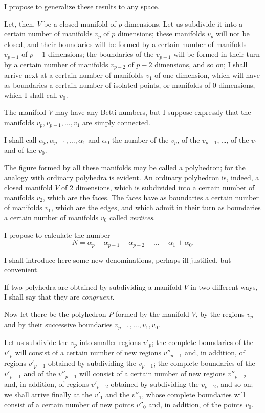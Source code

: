 \documentclass{article}
\begin{document}
I propose to generalize these results to any space.

Let, then, $V$ be a closed manifold of $p$ dimensions. Let us subdivide it into a certain number of manifolds $v_{p}$ of $p$ dimensions; these manifolds $v_{p}$ will not be closed, and their boundaries will be formed by a certain number of manifolds $v_{p-1}$ of $p - 1$ dimensions; the boundaries of the $v_{p-1}$ will be formed in their turn by a certain number of manifolds $v_{p-2}$ of $p - 2$ dimensions, and so on; I shall arrive next at a certain number of manifolds $v_{1}$ of one dimension, which will have as boundaries a certain number of isolated points, or manifolds of 0 dimensions, which I shall call $v_{0}$.

The manifold $V$ may have any Betti numbers, but I suppose expressly that the manifolds $v_{p}, v_{p-1}, \ldots, v_{1}$ are simply connected.

I shall call $\alpha_{p}, \alpha_{p-1}, \ldots, \alpha_{1}$ and $\alpha_{0}$ the number of the $v_{p}$, of the $v_{p-1}$, \ldots, of the $v_{1}$ and of the $v_{0}$.

The figure formed by all these manifolds may be called a polyhedron; for the analogy with ordinary polyhedra is evident. An ordinary polyhedron is, indeed, a closed manifold $V$ of 2 dimensions, which is subdivided into a certain number of manifolds $v_{2}$, which are the faces. The faces have as boundaries a certain number of manifolds $v_{1}$, which are the edges, and which admit in their turn as boundaries a certain number of manifolds $v_{0}$ called \emph{vertices}.

I propose to calculate the number
\[ N = \alpha_{p} - \alpha_{p-1} + \alpha_{p-2} - \ldots \mp \alpha_{1} \pm \alpha_{0}. \]

I shall introduce here some new denominations, perhaps ill justified, but convenient.

If two polyhedra are obtained by subdividing a manifold $V$ in two different ways, I shall say that they are \emph{congruent}.

Now let there be the polyhedron $P$ formed by the manifold $V$, by the regions $v_{p}$ and by their successive boundaries $v_{p-1}, \ldots, v_{1}, v_{0}$.

Let us subdivide the $v_{p}$ into smaller regions $v'_{p}$; the complete boundaries of the $v'_{p}$ will consist of a certain number of new regions $v''_{p-1}$ and, in addition, of regions $v'_{p-1}$ obtained by subdividing the $v_{p-1}$; the complete boundaries of the $v'_{p-1}$ and of the $v''_{p-1}$ will consist of a certain number of new regions $v''_{p-2}$ and, in addition, of regions $v'_{p-2}$ obtained by subdividing the $v_{p-2}$, and so on; we shall arrive finally at the $v'_{1}$ and the $v''_{1}$, whose complete boundaries will consist of a certain number of new points $v''_{0}$ and, in addition, of the points $v_{0}$.
\end{document}
